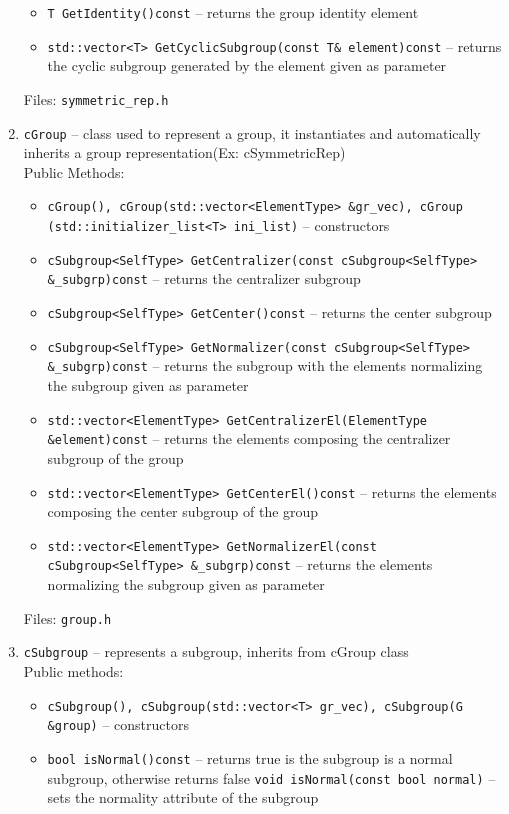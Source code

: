 \documentclass[a4paper,11pt]{article}
\begin{document}
\begin{enumerate}
\begin{itemize}
\item
\verb=T GetIdentity()const= -- returns the group identity element
\item
\verb=std::vector<T> GetCyclicSubgroup(const T& element)const= -- returns the cyclic subgroup generated by the element given as parameter
\end{itemize}
Files: \verb=symmetric_rep.h=
\item
\verb=cGroup= -- class used to represent a group, it instantiates and automatically inherits a group representation(Ex: cSymmetricRep)\\
Public Methods:
\begin{itemize}
\item
\verb=cGroup(), cGroup(std::vector<ElementType> &gr_vec), cGroup (std::initializer_list<T> ini_list)= -- constructors
\item
\verb=cSubgroup<SelfType> GetCentralizer(const cSubgroup<SelfType> &_subgrp)const= -- returns the centralizer subgroup
\item
\verb=cSubgroup<SelfType> GetCenter()const= -- returns the center subgroup
\item
\verb=cSubgroup<SelfType> GetNormalizer(const cSubgroup<SelfType> &_subgrp)const= -- returns the subgroup with the elements normalizing the subgroup given as parameter
\item
\verb=std::vector<ElementType> GetCentralizerEl(ElementType &element)const= -- returns the elements composing the centralizer subgroup of the group
\item
\verb=std::vector<ElementType> GetCenterEl()const= -- returns the elements composing the center subgroup of the group
\item
\verb=std::vector<ElementType> GetNormalizerEl(const cSubgroup<SelfType> &_subgrp)const= -- returns the elements normalizing the subgroup given as parameter
\end{itemize}
Files: \verb=group.h=
\item 
\verb=cSubgroup= -- represents a subgroup, inherits from cGroup class\\
Public methods:
\begin{itemize}
\item
\verb=cSubgroup(), cSubgroup(std::vector<T> gr_vec), cSubgroup(G &group)= -- constructors
\item
\verb=bool isNormal()const= -- returns true is the subgroup is a normal subgroup, otherwise returns false
\verb=void isNormal(const bool normal)= -- sets the normality attribute of the subgroup
\end{itemize}

\end{enumerate}
\end{document}
